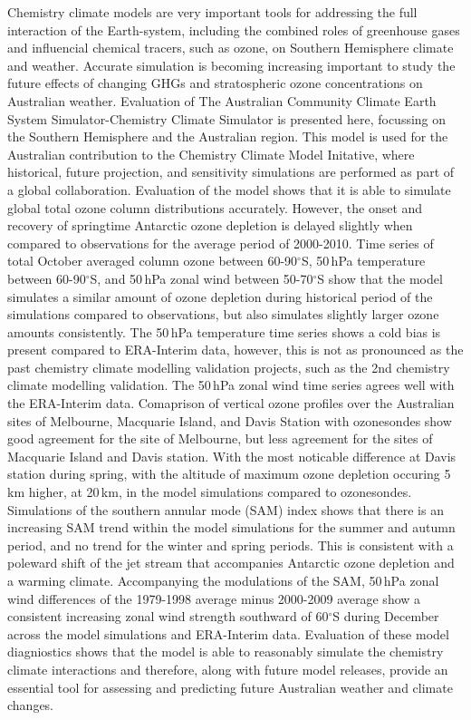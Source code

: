 Chemistry climate models are very important tools for addressing the full interaction of the Earth-system, including the combined roles of greenhouse gases and influencial chemical tracers, such as ozone, on Southern Hemisphere climate and weather. Accurate simulation is becoming increasing important to study the future effects of changing GHGs and stratospheric ozone concentrations on Australian weather. Evaluation of The Australian Community Climate Earth System Simulator-Chemistry Climate Simulator is presented here, focussing on the Southern Hemisphere and the Australian region. This model is used for the Australian contribution to the Chemistry Climate Model Initative, where historical, future projection, and sensitivity simulations are performed as part of a global collaboration. Evaluation of the model shows that it is able to simulate global total ozone column distributions accurately. However, the onset and recovery of springtime Antarctic ozone depletion is delayed slightly when compared to observations for the average period of 2000-2010. Time series of total October averaged column ozone between 60-90$^\circ$S, 50\,hPa temperature between 60-90$^\circ$S, and 50\,hPa zonal wind between 50-70$^\circ$S show that the model simulates a similar amount of ozone depletion during historical period of the simulations compared to observations, but also simulates slightly larger ozone amounts consistently. The 50\,hPa temperature time series shows a cold bias is present compared to ERA-Interim data, however, this is not as pronounced as the past chemistry climate modelling validation projects, such as the 2nd chemistry climate modelling validation. The 50\,hPa zonal wind time series agrees well with the ERA-Interim data. Comaprison of vertical ozone profiles over the Australian sites of Melbourne, Macquarie Island, and Davis Station with ozonesondes show good agreement for the site of Melbourne, but less agreement for the sites of Macquarie Island and Davis station. With the most noticable difference at Davis station during spring, with the altitude of maximum ozone depletion occuring 5\,km higher, at 20\,km, in the model simulations compared to ozonesondes. Simulations of the southern annular mode (SAM) index shows that there is an increasing SAM trend within the model simulations for the summer and autumn period, and no trend for the winter and spring periods. This is consistent with a poleward shift of the jet stream that accompanies Antarctic ozone depletion and a warming climate. Accompanying the modulations of the SAM, 50\,hPa zonal wind differences of the 1979-1998 average minus 2000-2009 average show a consistent increasing zonal wind strength southward of 60$^\circ$S during December across the model simulations and ERA-Interim data. Evaluation of these model diagniostics shows that the model is able to reasonably simulate the chemistry climate interactions and therefore, along with future model releases, provide an essential tool for assessing and predicting future Australian weather and climate changes.
